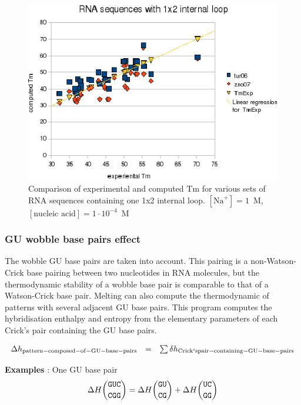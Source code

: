 \documentclass{article}
\begin{document}
\begin{figure}[h]
\includegraphics[width=1\linewidth]{images/1x2InternalLoop}
\caption{Comparison of experimental and computed Tm for various sets of
 RNA sequences containing one 1x2 internal loop. $[\mbox{Na}^+] = 1$~M, $[\mbox{nucleic acid}] = 1\cdot{}10^{-4}$~M}
\end{figure}

\pagebreak
\subsubsection{GU wobble base pairs effect}

The wobble GU base pairs are taken into account. This pairing is a non-Watson-Crick base pairing between two nucleotides 
in RNA molecules, but the thermodynamic stability of a wobble base pair is comparable to that of a Watson-Crick base pair.
Melting can also compute the thermodynamic of patterns with several adjacent GU base pairs.
This program computes the hybridisation enthalpy and entropy from the elementary 
parameters of each Crick's pair containing the GU base pairs.

\begin{displaymath}
  \begin{array}[t]{ccc}
  \Delta{}h_\mathrm{pattern-composed-of-GU-base-pairs}&=&\sum \delta{}h_\mathrm{Crick's pair-containing-GU-base-pairs}\\
  \end{array}
\end{displaymath}

\textbf{Examples} : One GU base pair
\begin{multline*}
\Delta H {\mbox{\texttt{GUC}} \choose \mbox{\texttt{CGG}}} = 
\Delta H {\mbox{\texttt{GU}} \choose \mbox{\texttt{CG}}} +
\Delta H {\mbox{\texttt{UC}} \choose \mbox{\texttt{GG}}}\\
\end{multline*}
\end{document}
